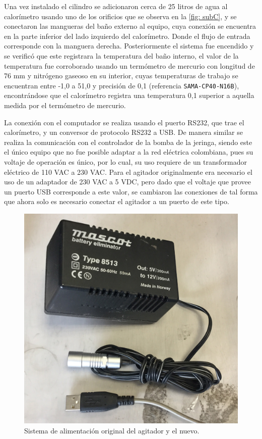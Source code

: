 	Una vez instalado el cilindro se adicionaron cerca de 25 litros de agua al calor\'imetro usando uno de los orificios que se observa en la \autoref{fig: subC}, y se conectaron las mangueras del baño externo al equipo, cuya conexión se encuentra en la parte inferior del lado izquierdo del calorímetro. Donde el flujo de entrada corresponde con la manguera derecha. Posteriormente el sistema fue encendido y se verific\'o que este registrara la temperatura del ba\~no interno, el valor de la temperatura fue corroborado usando un term\'ometro de mercurio con longitud de 76 mm y nitr\'ogeno gaseoso en su interior, cuyas temperaturas de trabajo se encuentran entre -1,0 \grad{} a 51,0 \grad{} y precisión de 0,1 \grad{} (referencia \texttt{SAMA-CP40-N16B}), encontr\'andose que el calor\'imetro registra una temperatura 0,1 \grad{} superior a aquella medida por el term\'ometro de mercurio.
	
	La conexión con el computador se realiza usando el puerto RS232, que trae el calorímetro, y un conversor de protocolo RS232 a USB. De manera similar se realiza la comunicación con el controlador de la bomba de la jeringa, siendo este el único equipo que no fue posible adaptar a la red eléctrica colombiana, pues su voltaje de operaci\'on es \'unico, por lo cual, su uso requiere de un transformador eléctrico de 110 VAC a 230 VAC. Para el agitador originalmente era necesario el uso de un adaptador de 230 VAC a 5 VDC, pero dado que el voltaje que provee un puerto USB corresponde a este valor, se cambiaron las conexiones de tal forma que ahora solo es necesario conectar el agitador a un puerto de este tipo.
	\begin{figure}[h]
		\centering
		\includegraphics[width=0.5\linewidth]{Figures/motorCircuit}
		\caption{Sistema de alimentaci\'on original del agitador y el nuevo.}
	\end{figure}
	
